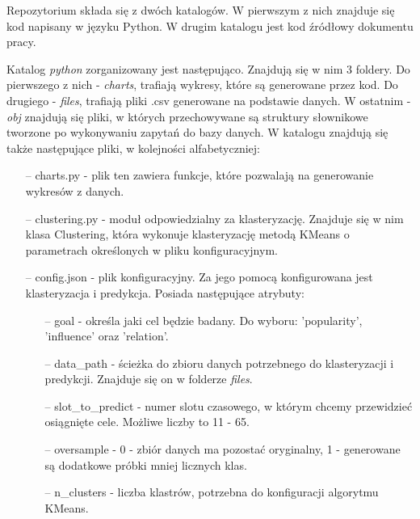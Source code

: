 \documentclass[polish,12pt]{aghthesis}
\begin{document}
Repozytorium składa się z dwóch katalogów. W pierwszym z nich znajduje się kod napisany w języku Python. W drugim katalogu jest kod źródłowy dokumentu pracy.

Katalog \textit{python} zorganizowany jest następująco. Znajdują się w nim 3 foldery. Do pierwszego z nich - \textit{charts}, trafiają wykresy, które są generowane przez kod. Do drugiego - \textit{files}, trafiają pliki .csv generowane na podstawie danych. W ostatnim - \textit{obj} znajdują się pliki, w których przechowywane są struktury słownikowe tworzone po wykonywaniu zapytań do bazy danych. W katalogu znajdują się także następujące pliki, w kolejności alfabetyczniej:

\begin{itemize}
    \setlength\itemsep{0,1em}
    \item[--] charts.py - plik ten zawiera funkcje, które pozwalają na generowanie wykresów z danych.
    \item[--] clustering.py - moduł odpowiedzialny za klasteryzację. Znajduje się w nim klasa Clustering, która wykonuje klasteryzację metodą KMeans o parametrach określonych w pliku konfiguracyjnym.
    \item[--] config.json - plik konfiguracyjny. Za jego pomocą konfigurowana jest klasteryzacja i predykcja. Posiada następujące atrybuty: 
    \begin{itemize}
        \setlength\itemsep{0,1em}
        \item[--] goal - określa jaki cel będzie badany. Do wyboru: 'popularity', 'influence' oraz 'relation'.
        \item[--] data\_path - ścieżka do zbioru danych potrzebnego do klasteryzacji i predykcji. Znajduje się on w folderze \textit{files}.
        \item[--] slot\_to\_predict - numer slotu czasowego, w którym chcemy przewidzieć osiągnięte cele. Możliwe liczby to 11 - 65.
        \item[--] oversample - 0 - zbiór danych ma pozostać oryginalny, 1 - generowane są dodatkowe próbki mniej licznych klas.
        \item[--] n\_clusters - liczba klastrów, potrzebna do konfiguracji algorytmu KMeans.
    \end{itemize}
    

\end{itemize}
\end{document}
